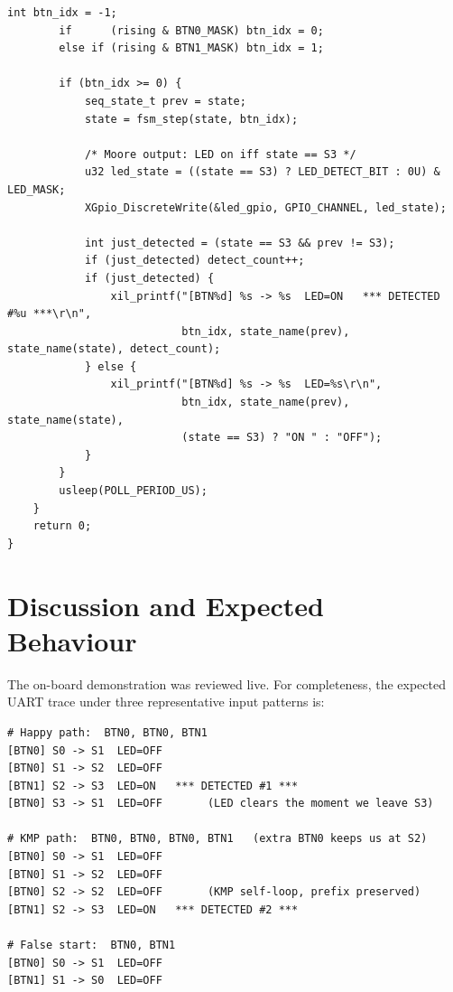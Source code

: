 \documentclass[11pt,letterpaper]{article}
\begin{document}
\begin{lstlisting}[caption={\texttt{Midterm/real/sw/main.c}},label={lst:main}]
        int btn_idx = -1;
        if      (rising & BTN0_MASK) btn_idx = 0;
        else if (rising & BTN1_MASK) btn_idx = 1;

        if (btn_idx >= 0) {
            seq_state_t prev = state;
            state = fsm_step(state, btn_idx);

            /* Moore output: LED on iff state == S3 */
            u32 led_state = ((state == S3) ? LED_DETECT_BIT : 0U) & LED_MASK;
            XGpio_DiscreteWrite(&led_gpio, GPIO_CHANNEL, led_state);

            int just_detected = (state == S3 && prev != S3);
            if (just_detected) detect_count++;
            if (just_detected) {
                xil_printf("[BTN%d] %s -> %s  LED=ON   *** DETECTED #%u ***\r\n",
                           btn_idx, state_name(prev), state_name(state), detect_count);
            } else {
                xil_printf("[BTN%d] %s -> %s  LED=%s\r\n",
                           btn_idx, state_name(prev), state_name(state),
                           (state == S3) ? "ON " : "OFF");
            }
        }
        usleep(POLL_PERIOD_US);
    }
    return 0;
}
\end{lstlisting}

\section{Discussion and Expected Behaviour}

The on-board demonstration was reviewed live. For completeness, the
expected UART trace under three representative input patterns is:

\begin{lstlisting}[language={},basicstyle=\ttfamily\footnotesize,
                   numbers=none,backgroundcolor=\color{codebg},
                   frame=single,breaklines=true,
                   xleftmargin=6pt,xrightmargin=2pt]
# Happy path:  BTN0, BTN0, BTN1
[BTN0] S0 -> S1  LED=OFF
[BTN0] S1 -> S2  LED=OFF
[BTN1] S2 -> S3  LED=ON   *** DETECTED #1 ***
[BTN0] S3 -> S1  LED=OFF       (LED clears the moment we leave S3)

# KMP path:  BTN0, BTN0, BTN0, BTN1   (extra BTN0 keeps us at S2)
[BTN0] S0 -> S1  LED=OFF
[BTN0] S1 -> S2  LED=OFF
[BTN0] S2 -> S2  LED=OFF       (KMP self-loop, prefix preserved)
[BTN1] S2 -> S3  LED=ON   *** DETECTED #2 ***

# False start:  BTN0, BTN1
[BTN0] S0 -> S1  LED=OFF
[BTN1] S1 -> S0  LED=OFF
\end{lstlisting}
\end{document}
